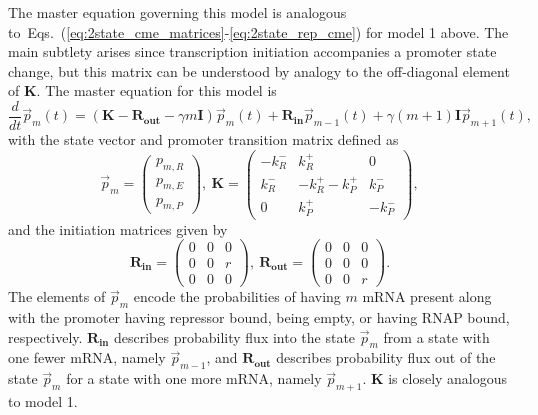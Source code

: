 \documentclass[12pt]{article}%
\newcommand{\vect}[1]{\vec{#1}}
\newcommand{\matr}[1]{\mathbf{#1}}
\newcommand{\deriv}[2][{}]{\frac{d #1}{d #2}}
\newcommand{\eqrange}[2]{Eqs.~(\ref{#1}-\ref{#2})}
\begin{document}
The master equation governing this model is analogous
to~\eqrange{eq:2state_cme_matrices}{eq:2state_rep_cme} for model 1 above.
The main subtlety arises since transcription initiation
accompanies a promoter state change, but this matrix can be
understood by analogy to the off-diagonal element of $\matr{K}$.
The master equation for this model is
\begin{equation}
\deriv{t}\vect{p}_m(t) =
\left( \matr{K} - \matr{R_{out}} - \gamma m \matr{I} \right) \vect{p}_m(t)
                + \matr{R_{in}} \vect{p}_{m-1}(t) +
                \gamma (m+1) \matr{I} \vect{p}_{m+1}(t),
\label{eq:3state_rep_cme}
\end{equation}
with the state vector and promoter transition matrix defined as
\begin{equation}
\vect{p}_m = \begin{pmatrix} p_{m,R} \\ p_{m,E} \\ p_{m,P} \end{pmatrix},\
\matr{K} = \begin{pmatrix} -k_R^- & k_R^+ & 0 \\
                        k_R^- & -k_R^+ -k_P^+ & k_P^- \\
                        0 & k_P^+ & -k_P^- 
                \end{pmatrix},
\label{eq:3state_cme_matrices_pt1}
\end{equation}
and the initiation matrices given by
\begin{equation}
\matr{R_{in}} = \begin{pmatrix}
                0 & 0 & 0 \\ 0 & 0 & r \\ 0 & 0 & 0
                \end{pmatrix},\
\matr{R_{out}} = \begin{pmatrix}
                0 & 0 & 0 \\ 0 & 0 & 0 \\ 0 & 0 & r
                \end{pmatrix}.
\label{eq:3state_cme_matrices_pt2}
\end{equation}
The elements of $\vect{p}_m$ encode the probabilities of having
$m$ mRNA present along with the promoter having repressor bound,
being empty, or having RNAP bound, respectively.
$\matr{R_{in}}$ describes probability flux into the state
$\vect{p}_m$ from a state with one fewer mRNA, namely
$\vect{p}_{m-1}$, and $\matr{R_{out}}$ describes probability flux
out of the state $\vect{p}_m$ for a state with one more mRNA,
namely $\vect{p}_{m+1}$.
$\matr{K}$ is closely analogous to model 1.
\end{document}

